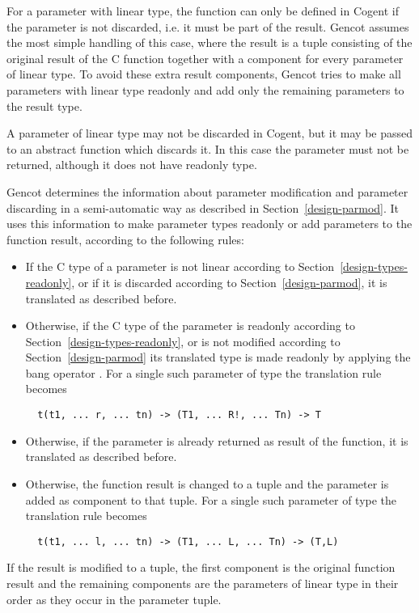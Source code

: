 For a parameter with linear type, the function can only be defined in Cogent if the parameter is not discarded,
i.e. it must be part of the result. Gencot assumes the most simple handling of this case, where the result
is a tuple consisting of the original result of the C function together with a component for every parameter
of linear type. To avoid these extra result components, Gencot tries to make all parameters with linear type
readonly and add only the remaining parameters to the result type.

A parameter of linear type may not be discarded in Cogent, but it may be passed to an abstract function which discards
it. In this case the parameter must not be returned, although it does not have readonly type.

Gencot determines the information about parameter modification and parameter discarding in a semi-automatic way
as described in Section~\ref{design-parmod}. It uses this information to make parameter types readonly or
add parameters to the function result, according to the following rules:
\begin{itemize}
\item If the C type of a parameter is not linear according to Section~\ref{design-types-readonly}, or if it
is discarded according to Section~\ref{design-parmod}, it is translated as described before.
\item Otherwise, if the C type of the parameter is readonly according to Section~\ref{design-types-readonly}, or
is not modified according to Section~\ref{design-parmod} its translated type is made readonly by applying the
bang operator \code{!}. For a single such parameter of type  the translation rule becomes
\begin{verbatim}
  t(t1, ... r, ... tn) -> (T1, ... R!, ... Tn) -> T
\end{verbatim}
\item Otherwise, if the parameter is already returned as result of the function, it is translated as described before.
\item Otherwise, the function result is changed to a tuple and the parameter is added as component to that tuple.
For a single such parameter of type  the translation rule becomes
\begin{verbatim}
  t(t1, ... l, ... tn) -> (T1, ... L, ... Tn) -> (T,L)
\end{verbatim}
\end{itemize}

If the result is modified to a tuple, the first component is the original function result and the remaining components
are the parameters of linear type in their order as they occur in the parameter tuple.

